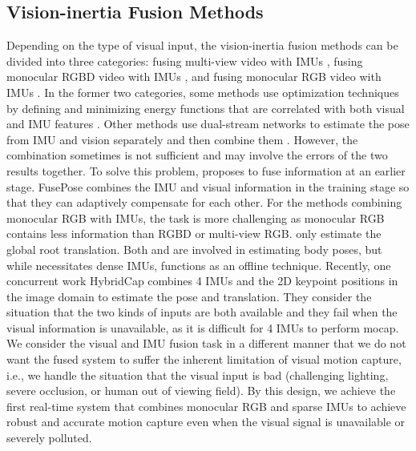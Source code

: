\documentclass[sigconf,nonacm=true]{acmart}
\newcommand{\hl}[1]{{#1}}
\begin{document}
\subsection{Vision-inertia Fusion Methods}
Depending on the type of visual input, the vision-inertia fusion methods can be divided into three categories: fusing multi-view video with IMUs \cite{pons2010multisensor,vonmarcardponsmollPAMI16,TotalCapture,malleson2020real,RealTimeFM,gilbert2019fusing,FusingWI,moniruzzaman2021wearable,bao2022fusepose,huang2020deepfuse}, fusing monocular RGBD video with IMUs \cite{helten2013real,zheng2018hybridfusion}, and fusing monocular RGB video with IMUs \cite{VIP,HybridCap,kaichi2020resolving,henschel2020accurate,henschel2019simultaneous}.
In the former two categories, some methods use optimization techniques by defining and minimizing energy functions that are correlated with both visual and IMU features \cite{vonmarcardponsmollPAMI16, RealTimeFM,pons2010multisensor,malleson2020real}.  
Other methods use dual-stream networks to estimate the pose from IMU and vision separately and then combine them \cite{TotalCapture,gilbert2019fusing}.  
However, the combination sometimes is not sufficient and may involve the errors of the two results together.
To solve this problem, \cite{FusingWI} proposes to fuse information at an earlier stage.  
FusePose \cite{bao2022fusepose} combines the IMU and visual information in the training stage so that they can adaptively compensate for each other.
For the methods combining monocular RGB with IMUs, the task is more challenging as monocular RGB contains less information than RGBD or multi-view RGB.
\cite{henschel2020accurate,henschel2019simultaneous} only estimate the global root translation.
\hl{Both \cite{kaichi2020resolving} and \cite{VIP} are involved in estimating body poses, but while \cite{kaichi2020resolving} necessitates dense IMUs, \cite{VIP} functions as an offline technique.}
Recently, one concurrent work HybridCap \cite{HybridCap} combines 4 IMUs and the 2D keypoint positions in the image domain to estimate the pose and translation.
They consider the situation that the two kinds of inputs are both available and they fail when the visual information is unavailable, as it is difficult for 4 IMUs to perform mocap.
We consider the visual and IMU fusion task in a different manner that we do not want the fused system to suffer the inherent limitation of visual motion capture, i.e., we handle the situation that the visual input is bad (challenging lighting, severe occlusion, or human out of viewing field).
By this design, we achieve the first real-time system that combines monocular RGB and sparse IMUs to achieve robust and accurate motion capture even when the visual signal is unavailable or severely polluted.
\end{document}
